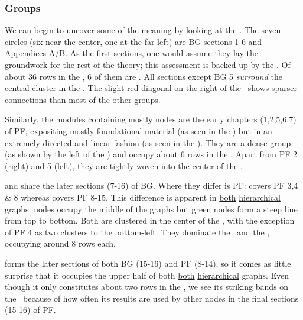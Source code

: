 \subsubsection{Groups}


We can begin to uncover some of the meaning by looking at the \modulegraph.  The
seven  circles (six near the center, one at the far left) are BG
sections 1-6 and Appendices A/B. As the first sections, one would assume they
lay the groundwork for the rest of the theory; this assessment is backed-up by
the \hiergraph. Of about 36 rows in the \gridgraph, 6 of them are .
All sections except BG 5 \emph{surround} the central cluster in the
\directgraph.  The slight red diagonal on the right of the \circlegraph\ shows
sparser connections than most of the other groups.

Similarly, the modules containing mostly  nodes are the early
chapters (1,2,5,6,7) of PF, expositing mostly foundational material (as seen in
the \hierflipgraph) but in an extremely directed and linear fashion (as seen in
the \hiergraph).  They are a dense group (as shown by the left of the
\circlegraph) and occupy about 6 rows in the \gridgraph. Apart from PF 2 (right)
and 5 (left), they are tightly-woven into the center of the \directgraph.

 and  share the later sections (7-16) of BG.
Where they differ is PF:  covers PF 3,4 \& 8 whereas
 covers PF 8-15. This difference is apparent in
\hyperref[fig:oot:hier]{both} \hyperref[fig:oot:hierflip]{hierarchical} graphs:
 nodes occupy the middle of the graphs but green nodes form
a steep line from top to bottom. Both are clustered in the center of the
\directgraph, with the exception of PF 4 as two  clusters to the
bottom-left. They dominate the \circlegraph\ and the \gridgraph, occupying
around 8 rows each.

 forms the later sections of both BG (15-16) and PF (8-14), so
it comes as little surprise that it occupies the upper half of both
\hyperref[fig:oot:hier]{both} \hyperref[fig:oot:hierflip]{hierarchical} graphs.
Even though it only constitutes about two rows in the \gridgraph, we see its
striking bands on the \circlegraph\ because of how often its results are used by
other nodes in the final sections (15-16) of PF.

